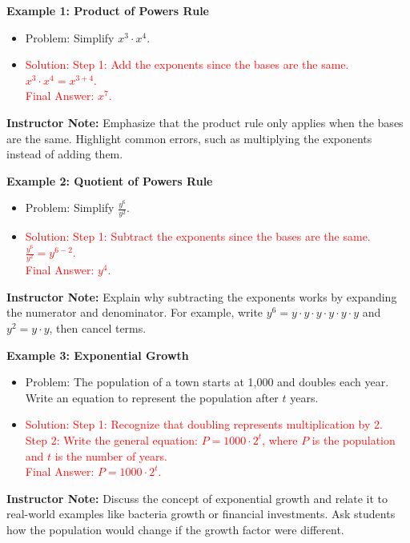 \documentclass[12pt]{article}
\begin{document}
\begin{tcolorbox}[colframe=black!60, colback=white, 
coltitle=black, colbacktitle=black!15, fonttitle=\bfseries\Large, 
title=Examples, halign title=center, left=10pt, right=10pt, top=10pt, bottom=15pt]
\textbf{Example 1: Product of Powers Rule}
\begin{itemize}
    \item Problem: Simplify \( x^3 \cdot x^4 \).
    \item \textcolor{red}{Solution: Step 1: Add the exponents since the bases are the same. \\ \( x^3 \cdot x^4 = x^{3+4} \). \\ Final Answer: \( x^7 \).}
\end{itemize}

{\color{blue} \textbf{Instructor Note:} Emphasize that the product rule only applies when the bases are the same. Highlight common errors, such as multiplying the exponents instead of adding them.}

\textbf{Example 2: Quotient of Powers Rule}
\begin{itemize}
    \item Problem: Simplify \( \frac{y^6}{y^2} \).
    \item \textcolor{red}{Solution: Step 1: Subtract the exponents since the bases are the same. \\ \( \frac{y^6}{y^2} = y^{6-2} \). \\ Final Answer: \( y^4 \).}
\end{itemize}

{\color{blue} \textbf{Instructor Note:} Explain why subtracting the exponents works by expanding the numerator and denominator. For example, write \( y^6 = y \cdot y \cdot y \cdot y \cdot y \cdot y \) and \( y^2 = y \cdot y \), then cancel terms.}

\textbf{Example 3: Exponential Growth}
\begin{itemize}
    \item Problem: The population of a town starts at 1,000 and doubles each year. Write an equation to represent the population after \(t\) years.
    \item \textcolor{red}{Solution: Step 1: Recognize that doubling represents multiplication by 2. \\ Step 2: Write the general equation: \( P = 1000 \cdot 2^t \), where \(P\) is the population and \(t\) is the number of years. \\ Final Answer: \( P = 1000 \cdot 2^t \).}
\end{itemize}

{\color{blue} \textbf{Instructor Note:} Discuss the concept of exponential growth and relate it to real-world examples like bacteria growth or financial investments. Ask students how the population would change if the growth factor were different.}
\end{tcolorbox}
\end{document}
